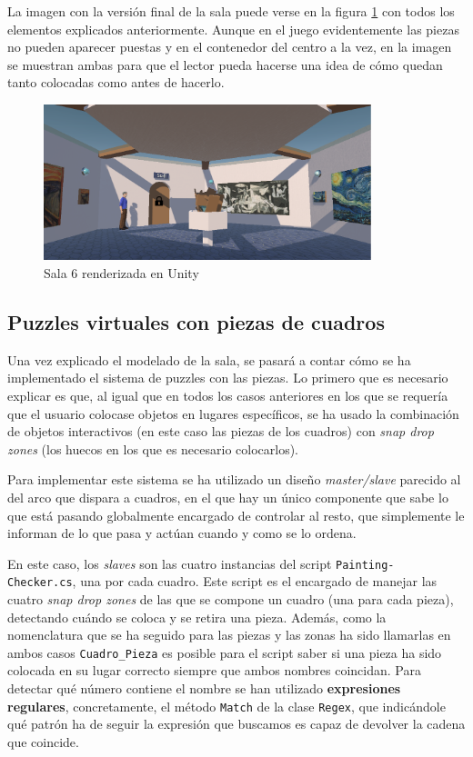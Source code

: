 La imagen con la versión final de la sala puede verse en la figura \ref{fig:unity-sala-6} con todos los elementos explicados anteriormente. Aunque en el juego evidentemente las piezas no pueden aparecer puestas y en el contenedor del centro a la vez, en la imagen se muestran ambas para que el lector pueda hacerse una idea de cómo quedan tanto colocadas como antes de hacerlo.

\begin{figure}[!h]
\begin{center}
\includegraphics[width=0.85\textwidth]{imagenes/7/salas-unity/unity-sala-6.png}
\caption{Sala 6 renderizada en Unity}
\label{fig:unity-sala-6}
\end{center}
\end{figure}

\subsection{Puzzles virtuales con piezas de cuadros}

Una vez explicado el modelado de la sala, se pasará a contar cómo se ha implementado el sistema de puzzles con las piezas. Lo primero que es necesario explicar es que, al igual que en todos los casos anteriores en los que se requería que el usuario colocase objetos en lugares específicos, se ha usado la combinación de objetos interactivos (en este caso las piezas de los cuadros) con \textit{snap drop zones} (los huecos en los que es necesario colocarlos).

Para implementar este sistema se ha utilizado un diseño \textit{master/slave} parecido al del arco que dispara a cuadros, en el que hay un único componente que sabe lo que está pasando globalmente encargado de controlar al resto, que simplemente le informan de lo que pasa y actúan cuando y como se lo ordena.

En este caso, los \textit{slaves} son las cuatro instancias del script \texttt{Painting-} \texttt{Checker.cs}, una por cada cuadro. Este script es el encargado de manejar las cuatro \textit{snap drop zones} de las que se compone un cuadro (una para cada pieza), detectando cuándo se coloca y se retira una pieza. Además, como la nomenclatura que se ha seguido para las piezas y las zonas ha sido llamarlas en ambos casos \texttt{Cuadro\_Pieza} es posible para el script saber si una pieza ha sido colocada en su lugar correcto siempre que ambos nombres coincidan. Para detectar qué número contiene el nombre se han utilizado \textbf{expresiones regulares}, concretamente, el método \texttt{Match} de la clase \texttt{Regex}, que indicándole qué patrón ha de seguir la expresión que buscamos es capaz de devolver la cadena que coincide.


